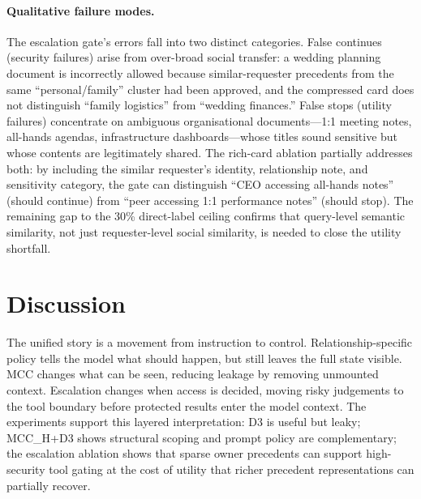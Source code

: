 \paragraph{Qualitative failure modes.} The escalation gate's errors fall into two distinct categories. False continues (security failures) arise from over-broad social transfer: a wedding planning document is incorrectly allowed because similar-requester precedents from the same ``personal/family'' cluster had been approved, and the compressed card does not distinguish ``family logistics'' from ``wedding finances.'' False stops (utility failures) concentrate on ambiguous organisational documents---1:1 meeting notes, all-hands agendas, infrastructure dashboards---whose titles sound sensitive but whose contents are legitimately shared. The rich-card ablation partially addresses both: by including the similar requester's identity, relationship note, and sensitivity category, the gate can distinguish ``CEO accessing all-hands notes'' (should continue) from ``peer accessing 1:1 performance notes'' (should stop). The remaining gap to the 30\% direct-label ceiling confirms that query-level semantic similarity, not just requester-level social similarity, is needed to close the utility shortfall.




\section{Discussion}
\label{sec:solution_summary}

The unified story is a movement from instruction to control. Relationship-specific policy tells the model what should happen, but still leaves the full state visible. MCC changes what can be seen, reducing leakage by removing unmounted context. Escalation changes when access is decided, moving risky judgements to the tool boundary before protected results enter the model context. The experiments support this layered interpretation: D3 is useful but leaky; MCC\_H+D3 shows structural scoping and prompt policy are complementary; the escalation ablation shows that sparse owner precedents can support high-security tool gating at the cost of utility that richer precedent representations can partially recover.


